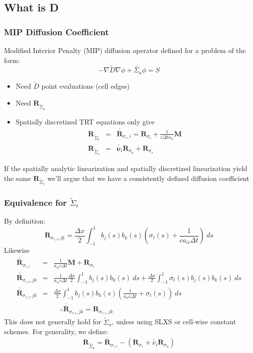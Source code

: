 \documentclass{beamer}
\newcommand{\be}{\begin{equation*}}   %
\newcommand{\ee}{\end{equation*}}
\newcommand{\bea}{\begin{eqnarray*}}  %
\newcommand{\eea}{\end{eqnarray*}}
\newcommand{\B}[1]{\ensuremath{b_{#1} }}			%
\newcommand{\R}[1]{\ensuremath{\mathbf{R}_{#1}}}
\newcommand{\M}{\ensuremath{ \mathbf M}}
\begin{document}
\subsection{What is D}
\begin{frame}
\frametitle{MIP Diffusion Coefficient}
Modified Interior Penalty (MIP) diffusion operator defined for a problem of the form:
\be
-\nabla \widetilde{D} \nabla \phi + \widetilde{\Sigma_a} \phi = S
\ee
\vspace{-0.2in}
\begin{itemize}
\item Need $\widetilde{D}$ point evaluations (cell edges)
\item Need $\R{\widetilde{\Sigma}_a}$
\item Spatially discretized TRT equations only give
\bea
\R{\widetilde{\Sigma}_t} &=& \overline{\overline{\mathbf R}}_{\sigma_{\tau},i} = \R{\sigma_t} + \frac{1}{c\Delta t a_{ii}}\M \\
\R{\widetilde{\Sigma}_s} &=& \overline{\overline{\mathbf \nu}}_i \R{\sigma_a} + \R{\sigma_s}
\eea
\end{itemize}
If  the spatially analytic linearization and spatially discretized linearization yield the same $\R{\widetilde{\Sigma}_t}$ we'll argue that we have a consistently defined diffusion coefficient

\end{frame}

\begin{frame}
\frametitle{Equivalence for $\widetilde{\Sigma}_t$}
\small
By definition:
\be
\R{\sigma_{\tau,i},jk} = \frac{\Delta x}{2} \int_{-1}^{1}{\B{j}(s) \B{k}(s) \left( \sigma_t(s) + \frac{1}{c a_{ii} \Delta t}  \right)~ds}
\ee
Likewise
\bea
\overline{\overline{\mathbf R}}_{\sigma_{\tau,i}} &=& \frac{1}{a_{ii} c \Delta t} \M + \R{\sigma_t} \\
\overline{\overline{\mathbf R}}_{\sigma_{\tau,i},jk} &=& \frac{1}{a_{ii} c \Delta t} \frac{\Delta x}{2} \int_{-1}^1{\B{j}(s) \B{k}(s) ~ds} + \frac{\Delta x}{2} \int_{-1}^1{ \sigma_t(s) \B{j}(s) \B{k}(s)~ds} \\
\overline{\overline{\mathbf R}}_{\sigma_{\tau,i},jk} &=& \frac{\Delta x}{2} \int_{-1}^1{  \B{j}(s) \B{k}(s) \left(\frac{1}{a_{ii} c \Delta t} + \sigma_t(s)  \right) ~ds} \\
& & ~~~~ \therefore  \overline{\overline{\mathbf R}}_{\sigma_{\tau,i},jk} = \R{\sigma_{\tau,i},jk}
\eea
This does not generally hold for $\widetilde{\Sigma}_a$, unless using SLXS or cell-wise constant schemes.  For generality, we define:
\be
\R{\widetilde{\Sigma}_a} = \overline{\overline{\mathbf R}}_{\sigma_{\tau,i}}  - \left( \R{\sigma_s} + \overline{\overline{\nu}}_i \R{\sigma_a} \right) 
\ee
\end{frame}
\end{document}
